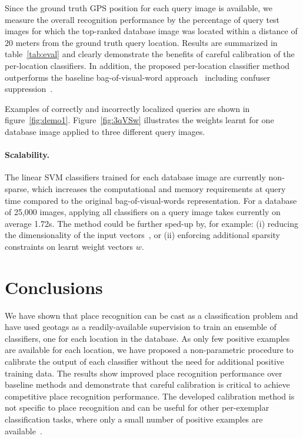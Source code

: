      

      Since the ground truth GPS position for each query image is available, we measure the overall recognition performance by the percentage of query test images for which the top-ranked database image was located within a distance of $20$ meters from the ground truth query location.  Results are summarized in table~\ref{tab:eval} and clearly demonstrate the benefits of  careful calibration of the per-location classifiers. In addition, the proposed per-location classifier method outperforms the baseline bag-of-visual-word approach~\cite{Philbin07} including confuser suppression~\cite{Knopp2010}.

      Examples of correctly and incorrectly localized queries are shown in figure~\ref{fig:demo1}. Figure~\ref{fig:3qVSw} illustrates the weights learnt for one database image applied
      to three different query images.

   \paragraph{Scalability.}
      The linear SVM classifiers trained for each database image are currently non-sparse,
      which increases the computational and memory requirements
      at query time compared to the original bag-of-visual-words representation.
      For a database of 25,000 images, applying all classifiers on a query image takes currently on average 1.72s. The method could be further sped-up by, for example: (i) reducing the dimensionality of the input vectors~\cite{Jegou12}, or (ii) enforcing additional sparsity constraints on learnt weight vectors $w$.

   
\section{Conclusions}
   We have shown that place recognition can be cast as a classification problem and have used geotags as a readily-available supervision to train an ensemble of classifiers, one for each location in the database. As only few positive examples are available for each location, we have proposed a non-parametric procedure to calibrate the output of each classifier without the need for additional positive training data. The results show improved place recognition performance over baseline methods and demonstrate that careful calibration is critical to achieve competitive place recognition performance. The developed calibration method is not specific to place recognition and can be useful for other per-exemplar classification tasks, where only a small number of positive examples are available~\cite{Malisiewicz11}.


